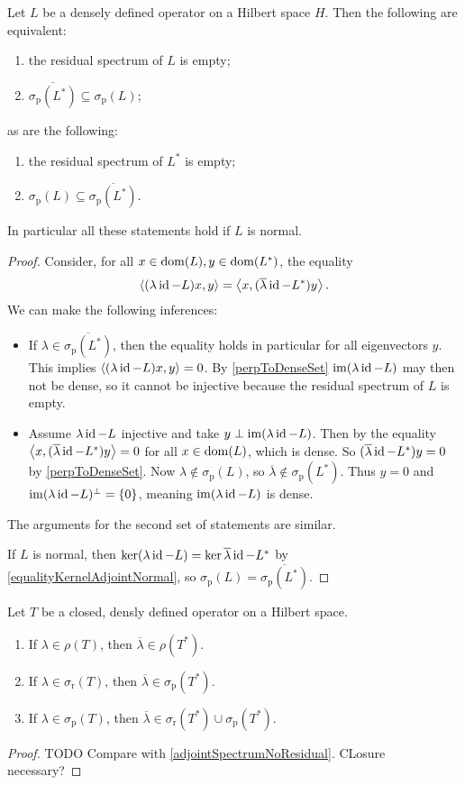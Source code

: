 \begin{proposition} \label{adjointSpectrumNoResidual}
Let $L$ be a densely defined operator on a Hilbert space $H$. Then the following are equivalent:
\begin{enumerate}
\item the residual spectrum of $L$ is empty;
\item $\overline{\sigma_\text{p}(L^*)} \subseteq \sigma_\text{p}(L)$;
\end{enumerate}
as are the following:
\begin{enumerate}
\item the residual spectrum of $L^*$ is empty;
\item $\sigma_\text{p}(L) \subseteq \overline{\sigma_\text{p}(L^*)}$.
\end{enumerate}
In particular all these statements hold if $L$ is normal.
\end{proposition}
\begin{proof}
Consider, for all $x\in \operatorname{dom}(L), y\in\operatorname{dom}(L^*)$, the equality
\[ \left\langle (\lambda\operatorname{id}-L)x,y \right\rangle = \left\langle x,(\overline{\lambda}\operatorname{id}-L^*)y \right\rangle. \]
We can make the following inferences:
\begin{itemize}
\item If $\lambda\in \overline{\sigma_\text{p}(L^*)}$, then the equality holds in particular for all eigenvectors $y$. This implies $\left\langle (\lambda\operatorname{id}-L)x,y \right\rangle = 0$. By \ref{perpToDenseSet} $\operatorname{im}(\lambda\operatorname{id}-L)$ may then not be dense, so it cannot be injective because the residual spectrum of $L$ is empty.
\item Assume $\lambda\operatorname{id}-L$ injective and take  $y\perp \operatorname{im}(\lambda\operatorname{id}-L)$. Then by the equality $\left\langle x, (\overline{\lambda}\operatorname{id} - L^*)y \right\rangle = 0$ for all $x\in\operatorname{dom}(L)$, which is dense. So $(\overline{\lambda}\operatorname{id} - L^*)y = 0$ by \ref{perpToDenseSet}. Now $\lambda\notin \sigma_\text{p}(L)$, so $\overline{\lambda}\notin \sigma_\text{p}(L^*)$. Thus $y = 0$ and $\operatorname{im}(\lambda\operatorname{id}-L)^\perp = \{0\}$, meaning $\operatorname{im}(\lambda\operatorname{id}-L)$ is dense.
\end{itemize}
The arguments for the second set of statements are similar.

If $L$ is normal, then $\ker(\lambda \operatorname{id} - L) = \ker{\overline{\lambda}\operatorname{id}-L^*}$ by \ref{equalityKernelAdjointNormal}, so $\sigma_\text{p}(L) = \overline{\sigma_\text{p}(L^*)}$.
\end{proof}

\begin{proposition}
Let $T$ be a closed, densly defined operator on a Hilbert space.
\begin{enumerate}
\item If $\lambda\in\rho(T)$, then $\overline{\lambda}\in\rho(T^*)$.
\item If $\lambda\in\sigma_\text{r}(T)$, then $\overline{\lambda}\in\sigma_\text{p}(T^*)$.
\item If $\lambda\in\sigma_\text{p}(T)$, then $\overline{\lambda}\in\sigma_\text{r}(T^*)\cup\sigma_\text{p}(T^*)$.
\end{enumerate}
\end{proposition}
\begin{proof}
TODO Compare with \ref{adjointSpectrumNoResidual}. CLosure necessary?
\end{proof}

